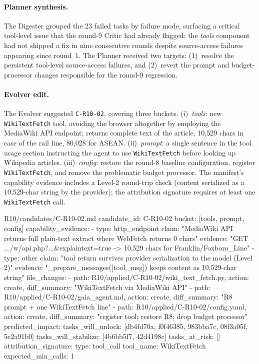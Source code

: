 \paragraph{Planner synthesis.} The Digester grouped the 23 failed tasks by failure mode, surfacing a critical tool-level issue that the round-9 Critic had already flagged: the \emph{tools} component had not shipped a fix in nine consecutive rounds despite source-access failures appearing since round~1. The Planner received two targets: (1)~resolve the persistent tool-level source-access failures, and (2)~revert the prompt and budget-processor changes responsible for the round-9 regression.

\paragraph{Evolver edit.} The Evolver suggested \texttt{C-R10-02}, covering three
buckets. (i)~\emph{tools}: new \texttt{WikiTextFetch} tool, avoiding the browser
altogether by employing the MediaWiki API endpoint; returns complete text of the
article, 10{,}529 chars in case of the rail line, 80{,}028 for ASEAN.
(ii)~\emph{prompt}: a single sentence in the tool usage section instructing the
agent to use \texttt{WikiTextFetch} before looking up Wikipedia articles. (iii)~\emph{config}:
restore the round-8 baseline configuration, register \texttt{WikiTextFetch},
and remove the problematic budget processor. The manifest's capability evidence includes a Level-2 round-trip check (content serialized as a 10{,}529-char string by the provider); the attribution signature requires at least one \texttt{WikiTextFetch} call.

\begin{manifestfile}{R10/candidates/C-R10-02.md}
candidate_id: C-R10-02
bucket: [tools, prompt, config]
capability_evidence:
  - type: http_endpoint
    claim: "MediaWiki API returns full plain-text extract where WebFetch returns 0 chars"
    evidence: "GET .../w/api.php?...&explaintext=true -> 10,529 chars for Franklin/Foxboro_Line"
  - type: other
    claim: "tool return survives provider serialization to the model (Level 2)"
    evidence: "_prepare_messages([tool_msg]) keeps content as 10,529-char string"
file_changes:
  - {path: R10/applied/C-R10-02/wiki_text_fetch.py, action: create, diff_summary: "WikiTextFetch via MediaWiki API"}
  - {path: R10/applied/C-R10-02/gaia_agent.md,     action: create, diff_summary: "R8 prompt + one WikiTextFetch line"}
  - {path: R10/applied/C-R10-02/config.yaml,        action: create, diff_summary: "register tool; restore R8; drop budget processor"}
predicted_impact:
  tasks_will_unlock:    [db4fd70a, f0f46385, 983bba7c, 08f3a05f, 5e2a91b0]
  tasks_will_stabilize: [4b6bb5f7, 42d4198c]
  tasks_at_risk:        []
attribution_signature:
  type: tool_call
  tool_name: WikiTextFetch
  expected_min_calls: 1
\end{manifestfile}


